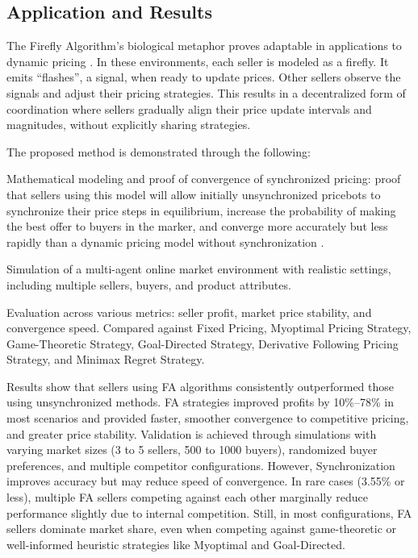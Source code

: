 \documentclass[a4paper, 12pt]{extarticle}
\begin{document}
\subsection{Application and Results} 

The Firefly Algorithm’s biological metaphor proves adaptable in applications to dynamic pricing \cite{jumadinova2008firefly}. In these environments, each seller is modeled as a firefly. It emits “flashes”, a signal, when ready to update prices. Other sellers observe the signals and adjust their pricing strategies. This results in a decentralized form of coordination where sellers gradually align their price update intervals and magnitudes, without explicitly sharing strategies. 

The proposed method is demonstrated through the following: 

Mathematical modeling and proof of convergence of synchronized pricing: proof that sellers using this model will allow initially unsynchronized pricebots to synchronize their price steps in equilibrium, increase the probability of making the best offer to buyers in the marker, and converge more accurately but less rapidly than a dynamic pricing model without synchronization \cite{jumadinova2008firefly}. 

Simulation of a multi-agent online market environment with realistic settings, including multiple sellers, buyers, and product attributes. 

Evaluation across various metrics: seller profit, market price stability, and convergence speed. Compared against Fixed Pricing, Myoptimal Pricing Strategy, Game-Theoretic Strategy, Goal-Directed Strategy, Derivative Following Pricing Strategy, and Minimax Regret Strategy. 

Results show that sellers using FA algorithms consistently outperformed those using unsynchronized methods. FA strategies improved profits by 10\%–78\% in most scenarios and provided faster, smoother convergence to competitive pricing, and greater price stability. Validation is achieved through simulations with varying market sizes (3 to 5 sellers, 500 to 1000 buyers), randomized buyer preferences, and multiple competitor configurations. However, Synchronization improves accuracy but may reduce speed of convergence. In rare cases (3.55\% or less), multiple FA sellers competing against each other marginally reduce performance slightly due to internal competition. Still, in most configurations, FA sellers dominate market share, even when competing against game-theoretic or well-informed heuristic strategies like Myoptimal and Goal-Directed. 
\end{document}
